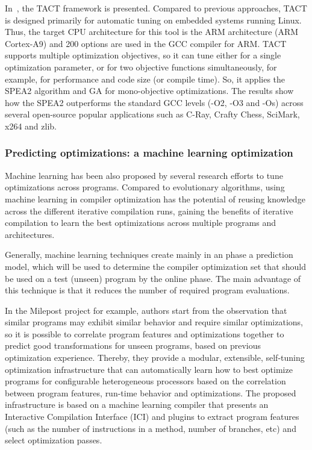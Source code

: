 In~\cite{plotnikov2013automatic}, the TACT framework is presented. 
Compared to previous approaches, TACT is designed primarily for automatic tuning on embedded systems running Linux. Thus, the target CPU architecture for this tool is the ARM architecture (ARM Cortex-A9) and 200 options are used in the GCC compiler for ARM. 
TACT supports multiple optimization objectives, so it can tune either for a single optimization parameter, or for two objective functions simultaneously, for example, for performance and code size (or compile time). So, it applies the SPEA2 algorithm and GA for mono-objective optimizations.
The results show how the SPEA2 outperforms the standard GCC levels (-O2, -O3 and -Os) across several open-source popular applications such as  C-Ray, Crafty Chess, SciMark, x264 and zlib.


 

\subsubsection{Predicting optimizations: a machine learning optimization}
Machine learning has been also proposed by several research efforts to tune optimizations across programs. Compared to evolutionary algorithms, using machine learning in compiler optimization has the potential of reusing knowledge across the different iterative compilation runs, gaining the benefits of iterative compilation to learn the best optimizations across multiple programs and architectures.

Generally, machine learning techniques create mainly in an  phase a prediction model, which will be used to determine the compiler optimization set that should be used on a test (unseen) program by the online phase. The main advantage of this technique is that it reduces the number of required program evaluations.

In the Milepost project\cite{fursin2011milepost} for example, authors start from the observation that similar programs may exhibit similar behavior and require similar optimizations, so it is possible to correlate program features and optimizations together to predict good transformations for unseen programs, based on previous optimization experience. Thereby, they provide a modular, extensible, self-tuning optimization infrastructure that can automatically learn how to best optimize programs for configurable heterogeneous processors based on the correlation between program features, run-time behavior and optimizations. 
The proposed infrastructure is based on a machine learning compiler that presents an Interactive Compilation Interface (ICI) and plugins to extract program features (such as the number of instructions in a method, number of branches, etc) and select optimization passes. 

